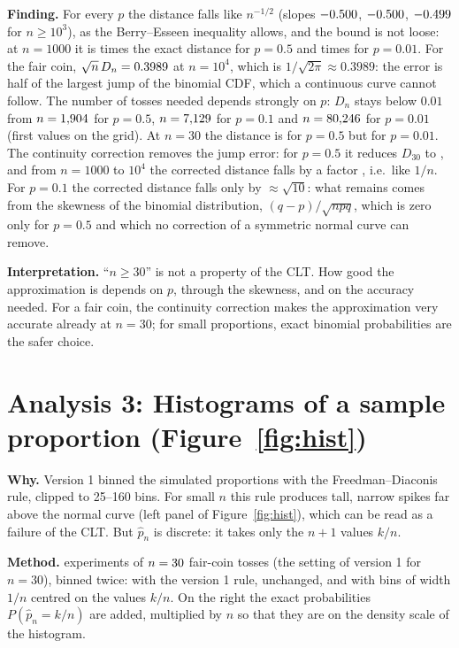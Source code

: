 \documentclass[11pt,a4paper]{article}
\begin{document}
\textbf{Finding.} For every $p$ the distance falls like $n^{-1/2}$ (slopes $-0.500$, $-0.500$, $-0.499$ for
$n \ge 10^3$), as the Berry--Esseen inequality allows, and the bound is not loose: at $n = 1000$ it is \BeOverDHalf{} times the
exact distance for $p = 0.5$ and \BeOverDHundredth{} times for $p = 0.01$. For the fair coin, $\sqrt n\,D_n = 0.3989$ at
$n = 10^4$, which is $1/\sqrt{2\pi} \approx 0.3989$: the error is half of the largest jump of the binomial CDF, which a
continuous curve cannot follow. The number of tosses needed depends strongly on $p$: $D_n$ stays below $0.01$ from
$n = 1{,}904$ for $p = 0.5$, $n = 7{,}129$ for $p = 0.1$ and $n = 80{,}246$ for $p = 0.01$ (first values on
the grid). At $n = 30$ the distance is \DHalfThirty{} for $p = 0.5$ but \DHundredthThirty{} for $p = 0.01$. The continuity
correction removes the jump error: for $p = 0.5$ it reduces $D_{30}$ to \DccHalfThirty{}, and from $n = 1000$ to $10^4$ the
corrected distance falls by a factor \DccRatioHalf{}, i.e.\ like $1/n$. For $p = 0.1$ the corrected distance falls only by
\DccRatioTenth{} $\approx \sqrt{10}$: what remains comes from the skewness of the binomial distribution,
$(q-p)/\sqrt{npq}$, which is zero only for $p = 0.5$ and which no correction of a symmetric normal curve can remove.

\textbf{Interpretation.} ``$n \ge 30$'' is not a property of the CLT. How good the approximation is depends on $p$, through the
skewness, and on the accuracy needed. For a fair coin, the continuity correction makes the approximation very accurate already
at $n = 30$; for small proportions, exact binomial probabilities are the safer choice.

\section{Analysis 3: Histograms of a sample proportion (Figure~\ref{fig:hist})}

\textbf{Why.} Version 1 binned the simulated proportions with the Freedman--Diaconis rule, clipped to 25--160 bins. For small $n$
this rule produces tall, narrow spikes far above the normal curve (left panel of Figure~\ref{fig:hist}), which can be read as
a failure of the CLT. But
$\hat p_n$ is discrete: it takes only the $n+1$ values $k/n$.

\textbf{Method.} \HistM{} experiments of $n = 30$ fair-coin tosses (the setting of version 1 for $n = 30$), binned twice: with the version 1 rule, unchanged, and with
bins of width $1/n$ centred on the values $k/n$. On the right the exact probabilities $P(\hat p_n = k/n)$ are added, multiplied by
$n$ so that they are on the density scale of the histogram.
\end{document}
